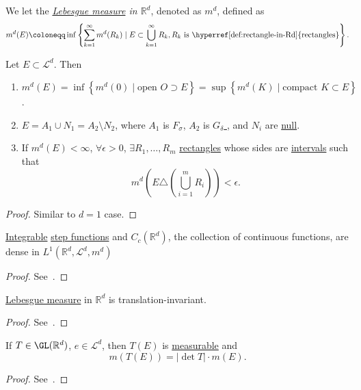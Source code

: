 \begin{definition}
	We let the \emph{\hyperref[def:Lebesgue-measure]{Lebesgue measure} in \(\mathbb{R} ^d\)}, denoted as \(m^d\), defined as
	\[
		m^d(E) \coloneqq \inf \left\{\sum\limits_{k=1}^{\infty} m^d(R_{k} )\mid E\subset \bigcup\limits_{k=1}^{\infty} R_{k} , R_{k} \text{ is \hyperref[def:rectangle-in-Rd]{rectangles}}\right\}.
	\]
\end{definition}
\begin{theorem}\label{thm:lec-20}
	Let \(E\subset \mathcal{L} ^d\). Then
	\begin{enumerate}[(1)]
		\item \(m^d(E) = \inf \left\{m^d (0) \mid \text{open } O\supset E \right\} = \sup \left\{m^d (K)\mid \text{compact }K\subset E \right\}\).
		\item \(E = A_1 \cup N_1 = A_2 \setminus N_2\), where \(A_1\) is \hyperref[def:F-sigma-set]{\(F_\sigma \)}, \(A_2\) is \hyperref[def:G-delta-set]{\(G_\delta \) }, and \(N_{i} \) are \hyperref[def:mu-null-set]{null}.
		\item If \(m^d(E)<\infty \), \(\forall \epsilon >0\), \(\exists R_1, \dots , R_m \) \hyperref[def:rectangle-in-Rd]{rectangles} whose sides are \underline{intervals} such that
		      \[
			      m^d \left(E\triangle \left(\bigcup\limits_{i=1}^{m} R_{i} \right)\right)< \epsilon .
		      \]
	\end{enumerate}
\end{theorem}
\begin{proof}
	Similar to \(d = 1\) case.
\end{proof}

\begin{theorem}
	\hyperref[def:integrable]{Integrable} \hyperref[def:step-function]{step functions} and \(C_c(\mathbb{R} ^d)\), the collection
	of continuous functions, are dense in \(L^1(\mathbb{R} ^d, \mathcal{L} ^d, m^d)\)
\end{theorem}
\begin{proof}
	See~\cite{folland1999real}.
\end{proof}

\begin{theorem}
	\hyperref[def:Lebesgue-measure]{Lebesgue measure} in \(\mathbb{R} ^d\) is translation-invariant.
\end{theorem}
\begin{proof}
	See~\cite{folland1999real}.
\end{proof}

\begin{theorem}\label{thm:effect-of-linear-transformation-on-Lebesgue-measure}
	If \(T\in \GL (\mathbb{R} ^d)\), \(e\in \mathcal{L} ^d\), then \(T(E)\) is \hyperref[def:measurable-function]{measurable} and
	\[
		m(T(E)) = \left\vert \det T \right\vert \cdot m(E).
	\]
\end{theorem}
\begin{proof}
	See~\cite{folland1999real}.
\end{proof}

